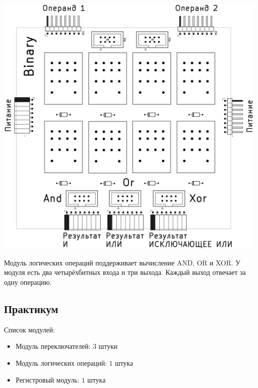 \begin{center}
\includegraphics{boards/logic_binary.png}
\end{center}

Модуль логических операций поддерживает вычисление AND, OR и XOR.
У модуля есть два четырёхбитных входа и три выхода.
Каждый выход отвечает за одну операцию.



\subsection{Практикум}


Список модулей:
\begin{itemize}
    \item Модуль переключателей: $3$ штуки
    \item Модуль логических операций: $1$ штука
    \item Регистровый модуль: $1$ штука
\end{itemize}



